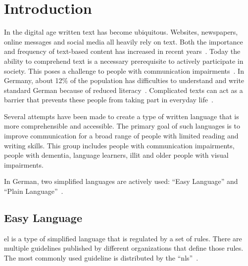 \chapter{Introduction}\label{ch:introduction}

In the digital age written text has become ubiquitous.
Websites, newspapers, online messages and social media all heavily rely on text.
Both the importance and frequency of text-based content has increased in recent years~\autocite{salar-mohtaj-babak-naderi-2022-overview}.
Today the ability to comprehend text is a necessary prerequisite to actively participate in society. %
This poses a challenge to people with communication impairments~\autocite{easyLanguageBook}.
In Germany, about 12\% of the population has difficulties to understand and write standard German because of reduced literacy~\autocite{schomacker2023data}.
Complicated texts can act as a barrier that prevents these people from taking part in everyday life~\autocite{easyLanguageBook}.

Several attempts have been made to create a type of written language that is more comprehensible and accessible.
The primary goal of such languages is to improve communication for a broad range of people with limited reading and writing skills.
This group includes people with communication impairments, people with dementia, language learners, \gls{illit} and older people with visual impairments.

In German, two simplified languages are actively used: \enquote{Easy Language} and \enquote{Plain Language}~\autocite{easyLanguageBook}. %


\section{Easy Language}\label{sec:el}

\gls{el} is a type of simplified language that is regulated by a set of rules.
There are multiple guidelines published by different organizations that define those rules.
The most commonly used guideline is distributed by the \enquote{\gls{nls}}~\autocite{netzwerkLS, easyLanguageBook}.

